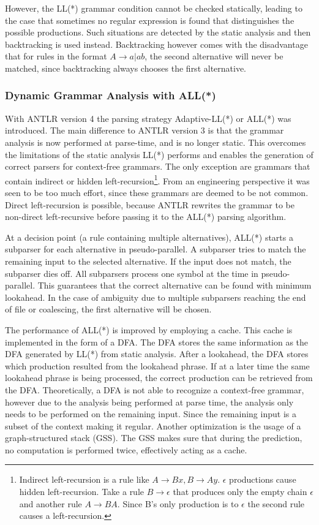 However, the LL(*) grammar condition cannot be checked statically, leading to the case that sometimes no regular expression is found that distinguishes the possible productions. Such situations are detected by the static analysis and then backtracking is used instead. Backtracking however comes with the disadvantage that for rules in the format $A \rightarrow a | ab$, the second alternative will never be matched, since backtracking always chooses the first alternative. 

\subsubsection{Dynamic Grammar Analysis with ALL(*)}

With ANTLR version 4 the parsing strategy Adaptive-LL(*) or ALL(*) was introduced. The main difference to ANTLR version 3 is that the grammar analysis is now performed at parse-time, and is no longer static. This overcomes the limitations of the static analysis LL(*) performs and enables the generation of correct parsers for context-free grammars. The only exception are grammars that contain indirect or hidden left-recursion\footnote{Indirect left-recursion is a rule like $A \rightarrow Bx, B \rightarrow Ay$. $\epsilon$ productions cause hidden left-recursion. Take a rule $B \rightarrow \epsilon$ that produces only the empty chain $\epsilon$ and another rule $A \rightarrow BA$. Since B's only production is to $\epsilon$ the second rule causes a left-recursion. }. From an engineering perspective it was seen to be too much effort, since these grammars are deemed to be not common. Direct left-recursion is possible, because ANTLR rewrites the grammar to be non-direct left-recursive before passing it to the ALL(*) parsing algorithm. 

At a decision point (a rule containing multiple alternatives), ALL(*) starts a subparser for each alternative in pseudo-parallel. A subparser tries to match the remaining input to the selected alternative. If the input does not match, the subparser dies off. All subparsers process one symbol at the time in pseudo-parallel. This guarantees that the correct alternative can be found with minimum lookahead. In the case of ambiguity due to multiple subparsers reaching the end of file or coalescing, the first alternative will be chosen. 

The performance of ALL(*) is improved by employing a cache. This cache is implemented in the form of a DFA. The DFA stores the same information as the DFA generated by LL(*) from static analysis. After a lookahead, the DFA stores which production resulted from the lookahead phrase. If at a later time the same lookahead phrase is being processed, the correct production can be retrieved from the DFA. Theoretically, a DFA is not able to recognize a context-free grammar, however due to the analysis being performed at parse time, the analysis only needs to be performed on the remaining input. Since the remaining input is a subset of the context making it regular. Another optimization is the usage of a graph-structured stack (GSS). The GSS makes sure that during the prediction, no computation is performed twice, effectively acting as a cache. 

